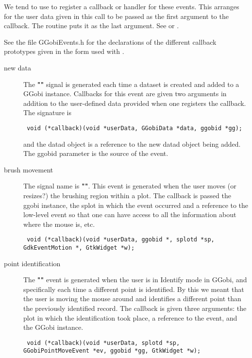 \documentclass{article}
\def\SignalName#1{\textbf{"\Escape{#1}"}}
\begin{document}
We tend to use  to register a
callback or handler for these events.  This arranges for the user data
given in this call to be passed as the first argument to the callback.
The routine  puts it as the last
argument. See \cite{pennington99} or \cite{gtkTutorial}.

See the file GGobiEvents.h for the declarations of the different
callback prototypes given in the form used with
.

\begin{description}
\item[new data] The \SignalName{datad_added} signal is generated each
  time a dataset is created and added to a GGobi instance.  Callbacks
for this event are given two arguments
in addition to the user-defined data provided when
one registers the callback.
The signature is
\begin{verbatim}
 void (*callback)(void *userData, GGobiData *data, ggobid *gg);
\end{verbatim}
and the datad object is a reference to the new 
datad object being added. The ggobid parameter is the source of the event.

\item[brush movement] 
The signal name is \SignalName{brush_motion}.
This event is generated when the user moves (or
  resizes?)  the brushing region within a plot.  The callback is
  passed the ggobi instance, the splot in which the event occurred and
  a reference to the low-level event so that one can have access to
  all the information about where the mouse is, etc.
\begin{verbatim}
 void (*callback)(void *userData, ggobid *, splotd *sp, GdkEventMotion *, GtkWidget *w);
\end{verbatim}

\item[point identification] The \SignalName{identify_point} event is
generated when the user is in Identify mode in GGobi, and specifically
each time a different point is identified. By this we meant that the
user is moving the mouse around and identifies a different point than
the previously identified record.  The callback is given three
arguments: the plot in which the identification took place, a
reference to the  event, and the GGobi
instance.
\begin{verbatim}
 void (*callback)(void *userData, splotd *sp, GGobiPointMoveEvent *ev, ggobid *gg, GtkWidget *w);
\end{verbatim}


\end{description}
\end{document}
